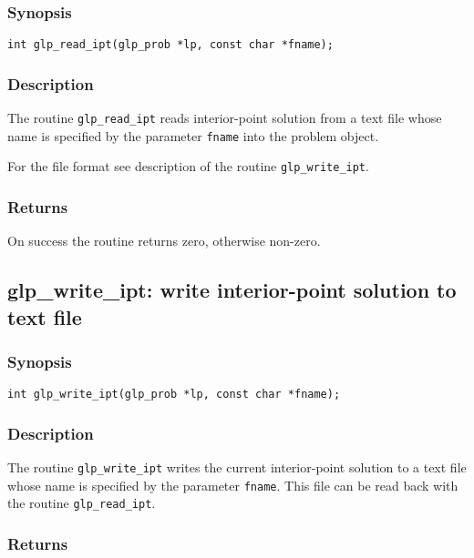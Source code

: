 \subsubsection*{Synopsis}

\begin{verbatim}
int glp_read_ipt(glp_prob *lp, const char *fname);
\end{verbatim}

\subsubsection*{Description}

The routine \verb|glp_read_ipt| reads interior-point solution from a
text file whose name is specified by the parameter \verb|fname| into the
problem object.

For the file format see description of the routine \verb|glp_write_ipt|.

\subsubsection*{Returns}

On success the routine returns zero, otherwise non-zero.

\subsection{glp\_write\_ipt: write interior-point solution to text
file}

\subsubsection*{Synopsis}

\begin{verbatim}
int glp_write_ipt(glp_prob *lp, const char *fname);
\end{verbatim}

\subsubsection*{Description}

The routine \verb|glp_write_ipt| writes the current interior-point
solution to a text file whose name is specified by the parameter
\verb|fname|. This file can be read back with the routine
\verb|glp_read_ipt|.

\subsubsection*{Returns}


